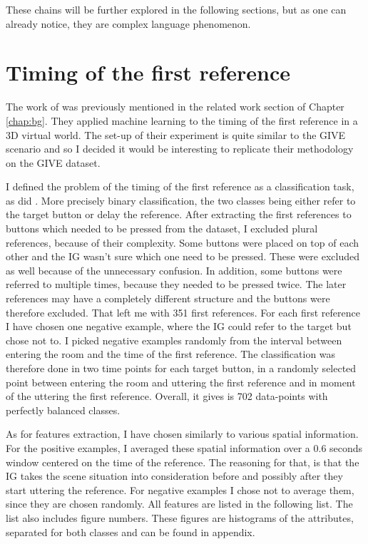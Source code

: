 These chains will be further explored in the following sections, but as one can already notice, they are complex language phenomenon.

\section{Timing of the first reference}
\label{sec:timing-firsref-ml}
The work of \citet{stoia2006sentence} was previously mentioned in the related work section of Chapter \ref{chap:bg}. They applied machine learning to the timing of the first reference in a 3D virtual world. The set-up of their experiment is quite similar to the GIVE scenario and so I decided it would be interesting to replicate their methodology on the GIVE dataset. 

I defined the problem of the timing of the first reference as a classification task, as did \citet{stoia2006sentence}. More precisely binary classification, the two classes being either refer to the target button or delay the reference. After extracting the first references to buttons which needed to be pressed from the dataset, I excluded plural references, because of their complexity. Some buttons were placed on top of each other and the IG wasn't sure which one need to be pressed. These were excluded as well because of the unnecessary confusion. In addition, some buttons were referred to multiple times, because they needed to be pressed twice. The later references may have a completely different structure and the buttons were therefore excluded. That left me with 351 first references. For each first reference I have chosen one negative example, where the IG could refer to the target but chose not to. I picked negative examples randomly from the interval between entering the room and the time of the first reference. The classification was therefore done in two time points for each target button, in a randomly selected point between entering the room and uttering the first reference and in moment of the uttering the first reference. Overall, it gives is 702 data-points with perfectly balanced classes.

As for features extraction, I have chosen similarly to \citet{stoia2006sentence} various spatial information. For the positive examples, I averaged these spatial information over a 0.6 seconds window centered on the time of the reference. The reasoning for that, is that the IG takes the scene situation into consideration before and possibly after they start uttering the reference. For negative examples I chose not to average them, since they are chosen randomly. All features are listed in the following list. The list also includes figure numbers. These figures are histograms of the attributes, separated for both classes and can be found in appendix.

